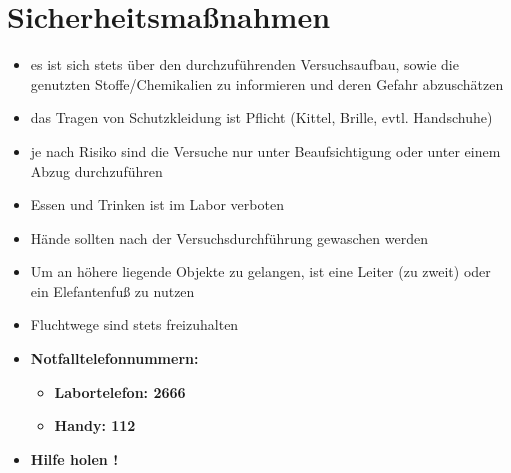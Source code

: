 \section{Sicherheitsmaßnahmen}
\begin{itemize}
	\item es ist sich stets über den durchzuführenden Versuchsaufbau, sowie die genutzten Stoffe/Chemikalien zu informieren und deren Gefahr abzuschätzen
	\item das Tragen von Schutzkleidung ist Pflicht (Kittel, Brille, evtl. Handschuhe)
	\item je nach Risiko sind die Versuche nur unter Beaufsichtigung oder unter einem Abzug durchzuführen
	\item  Essen und Trinken ist im Labor verboten
	\item  Hände sollten nach der Versuchsdurchführung gewaschen werden 
	\item Um an höhere liegende Objekte zu gelangen, ist eine Leiter (zu zweit) oder ein Elefantenfuß zu nutzen
	\item Fluchtwege sind stets freizuhalten
	\item \textbf{Notfalltelefonnummern:}
		\begin{itemize}
			\item \textbf{Labortelefon: 2666}
			\item \textbf{Handy: 112}
		\end{itemize}
	\item \textbf{{\Large Hilfe holen !}}
\end{itemize}

